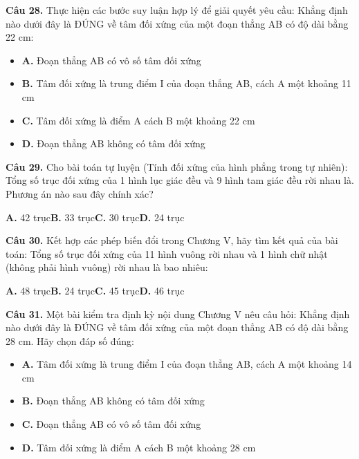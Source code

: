\documentclass[11pt,a4paper]{article}
\begin{document}
\textbf{\color{primary} Câu 28.} Thực hiện các bước suy luận hợp lý để giải quyết yêu cầu: Khẳng định nào dưới đây là ĐÚNG về tâm đối xứng của một đoạn thẳng AB có độ dài bằng 22 cm:\par
\begin{itemize}\setlength{\itemsep}{1pt}\setlength{\parskip}{0pt}
  \item[] \textbf{A.} Đoạn thẳng AB có vô số tâm đối xứng
  \item[] \textbf{B.} Tâm đối xứng là trung điểm I của đoạn thẳng AB, cách A một khoảng 11 cm
  \item[] \textbf{C.} Tâm đối xứng là điểm A cách B một khoảng 22 cm
  \item[] \textbf{D.} Đoạn thẳng AB không có tâm đối xứng
\end{itemize}\vspace{2pt}
\textbf{\color{primary} Câu 29.} Cho bài toán tự luyện (Tính đối xứng của hình phẳng trong tự nhiên): Tổng số trục đối xứng của 1 hình lục giác đều và 9 hình tam giác đều rời nhau là. Phương án nào sau đây chính xác?\par
\hspace*{1.5em}\textbf{A.} 42 trục\quad\quad \textbf{B.} 33 trục\quad\quad \textbf{C.} 30 trục\quad\quad \textbf{D.} 24 trục\par\vspace{2pt}
\textbf{\color{primary} Câu 30.} Kết hợp các phép biến đổi trong Chương V, hãy tìm kết quả của bài toán: Tổng số trục đối xứng của 11 hình vuông rời nhau và 1 hình chữ nhật (không phải hình vuông) rời nhau là bao nhiêu:\par
\hspace*{1.5em}\textbf{A.} 48 trục\quad\quad \textbf{B.} 24 trục\quad\quad \textbf{C.} 45 trục\quad\quad \textbf{D.} 46 trục\par\vspace{2pt}
\textbf{\color{primary} Câu 31.} Một bài kiểm tra định kỳ nội dung Chương V nêu câu hỏi: Khẳng định nào dưới đây là ĐÚNG về tâm đối xứng của một đoạn thẳng AB có độ dài bằng 28 cm. Hãy chọn đáp số đúng:\par
\begin{itemize}\setlength{\itemsep}{1pt}\setlength{\parskip}{0pt}
  \item[] \textbf{A.} Tâm đối xứng là trung điểm I của đoạn thẳng AB, cách A một khoảng 14 cm
  \item[] \textbf{B.} Đoạn thẳng AB không có tâm đối xứng
  \item[] \textbf{C.} Đoạn thẳng AB có vô số tâm đối xứng
  \item[] \textbf{D.} Tâm đối xứng là điểm A cách B một khoảng 28 cm
\end{itemize}\vspace{2pt}
\end{document}

